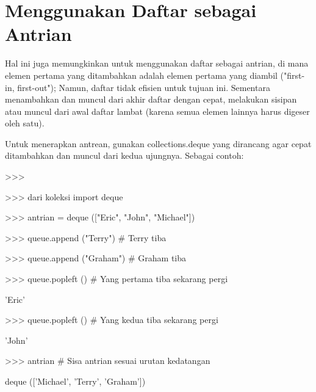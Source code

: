\section{Menggunakan Daftar sebagai Antrian} \par
\vspace{12pt}
Hal ini juga memungkinkan untuk menggunakan daftar sebagai antrian, di mana elemen pertama yang ditambahkan adalah elemen pertama yang diambil ("first-in, first-out"); Namun, daftar tidak efisien untuk tujuan ini. Sementara menambahkan dan muncul dari akhir daftar dengan cepat, melakukan sisipan atau muncul dari awal daftar lambat (karena semua elemen lainnya harus digeser oleh satu). \par
\vspace{12pt}
Untuk menerapkan antrean, gunakan collections.deque yang dirancang agar cepat ditambahkan dan muncul dari kedua ujungnya. Sebagai contoh: \par
>>> \par
\vspace{12pt}
>>> dari koleksi import deque \par
>>> antrian = deque (["Eric", "John", "Michael"]) \par
>>> queue.append ("Terry")  $  \#  $ Terry tiba \par
>>> queue.append ("Graham")  $  \#  $ Graham tiba \par
>>> queue.popleft ()  $  \#  $ Yang pertama tiba sekarang pergi \par
'Eric' \par
>>> queue.popleft ()  $  \#  $ Yang kedua tiba sekarang pergi \par
'John' \par
>>> antrian  $  \#  $ Sisa antrian sesuai urutan kedatangan \par
deque (['Michael', 'Terry', 'Graham']) \par
\vspace{12pt}
